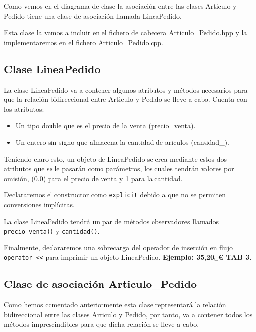 Como vemos en el diagrama de clase la asociación entre las clases Articulo y Pedido tiene una clase de asociación llamada LineaPedido.

Esta clase la vamos a incluir en el fichero de cabecera Articulo\_Pedido.hpp y la implementaremos en el fichero Articulo\_Pedido.cpp.

\subsection{Clase LineaPedido}
La clase LineaPedido va a contener algunos atributos y métodos necesarios para que la relación bidireccional entre Articulo y Pedido se lleve a cabo. Cuenta con los atributos:
\begin{itemize}
  \item Un tipo double que es el precio de la venta (precio\_venta).
  \item Un entero sin signo que almacena la cantidad de ariculos (cantidad\_).
\end{itemize}

Teniendo claro esto, un objeto de LineaPedido se crea mediante estos dos atributos que se le pasarán como parámetros, los cuales tendrán valores por omisión, (0.0) para el precio de venta y 1 para la cantidad.

Declararemos el constructor como \texttt{explicit} debido a que no se permiten conversiones implícitas.

La clase LineaPedido tendrá un par de métodos observadores llamados \texttt{precio\_venta()} y \texttt{cantidad()}.

Finalmente, declararemos una sobrecarga del operador de inserción en flujo \texttt{operator <<} para imprimir un objeto LineaPedido. \textbf{Ejemplo: 35,20␣€ TAB 3}.
\newpage
\subsection{Clase de asociación Articulo\_Pedido}
Como hemos comentado anteriormente esta clase representará la relación bidireccional entre las clases Articulo y Pedido, por tanto, va a contener todos los métodos imprescindibles para que dicha relación se lleve a cabo.

